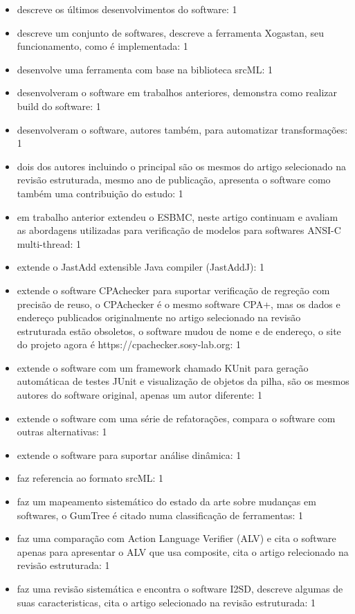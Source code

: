 \begin{itemize}
\item descreve os últimos desenvolvimentos do software: 1
\item descreve um conjunto de softwares, descreve a ferramenta Xogastan, seu funcionamento, como é implementada: 1
\item desenvolve uma ferramenta com base na biblioteca srcML: 1
\item desenvolveram o software em trabalhos anteriores, demonstra como realizar build do software: 1
\item desenvolveram o software, autores também, para automatizar transformações: 1
\item dois dos autores incluindo o principal são os mesmos do artigo selecionado na revisão estruturada, mesmo ano de publicação, apresenta o software como também uma contribuição do estudo: 1
\item em trabalho anterior extendeu o ESBMC, neste artigo continuam e avaliam as abordagens utilizadas para verificação de modelos para softwares ANSI-C multi-thread: 1
\item extende o JastAdd extensible Java compiler (JastAddJ): 1
\item extende o software CPAchecker para suportar verificação de regreção com precisão de reuso, o CPAchecker é o mesmo software CPA+, mas os dados e endereço publicados originalmente no artigo selecionado na revisão estruturada estão obsoletos, o software mudou de nome e de endereço, o site do projeto agora é https://cpachecker.sosy-lab.org: 1
\item extende o software com um framework chamado KUnit para geração automáticaa de testes JUnit e visualização de objetos da pilha, são os mesmos autores do software original, apenas um autor diferente: 1
\item extende o software com uma série de refatorações, compara o software com outras alternativas: 1
\item extende o software para suportar análise dinâmica: 1
\item faz referencia ao formato srcML: 1
\item faz um mapeamento sistemático do estado da arte sobre mudanças em softwares, o GumTree é citado numa classificação de ferramentas: 1
\item faz uma comparação com Action Language Verifier (ALV) e cita o software apenas para apresentar o ALV que usa composite, cita o artigo relecionado na revisão estruturada: 1
\item faz uma revisão sistemática e encontra o software I2SD, descreve algumas de suas caracteristicas, cita o artigo selecionado na revisão estruturada: 1

\end{itemize}
